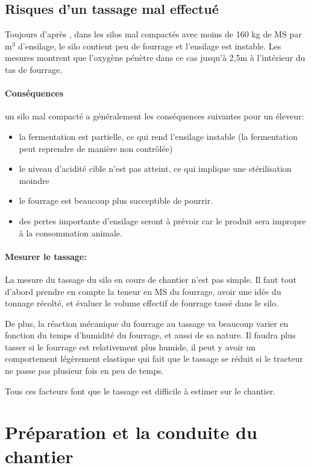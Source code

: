 \documentclass[12pt,a4paper]{report}
\begin{document}
\subsection{Risques d'un tassage mal effectué}
Toujours d'après \cite{trachsler_planifier_nodate}, dans les silos mal compactés avec moins de 160 kg de MS par m$^3$ d'ensilage, le silo contient peu de fourrage et l'ensilage est instable. Les mesures montrent que l'oxygène pénètre dans ce cas jusqu'à 2,5m à l'intérieur du tas de fourrage. 

\paragraph{Conséquences} un silo mal compacté a généralement les conséquences suivantes pour un éleveur:

\begin{itemize}
	\item la fermentation est partielle, ce qui rend l'ensilage instable (la fermentation peut reprendre de manière non contrôlée)
	\item le niveau d'acidité cible n'est pas atteint, ce qui implique une stérilisation moindre
	\item le fourrage est beaucoup plus succeptible de pourrir.
	\item des pertes importante d'ensilage seront à prévoir car le produit sera impropre à la consommation animale.
\end{itemize}

\paragraph{Mesurer le tassage:} La mesure du tassage du silo en cours de chantier n'est pas simple. Il faut tout d'abord prendre en compte la teneur en MS du fourrage, avoir une idée du tonnage récolté, et évaluer le volume effectif de fourrage tassé dans le silo.
\newline

De plus, la réaction mécanique du fourrage au tassage va beaucoup varier en fonction du temps d'humidité du fourrage, et aussi de sa nature. Il faudra plus tasser si le fourrage est relativement plus humide, il peut y avoir un comportement légèrement elastique qui fait que le tassage se réduit si le tracteur ne passe pas plusieur fois en peu de temps. 

Tous ces facteurs font que le tassage est difficile à estimer sur le chantier.

\section{Préparation et la conduite du chantier}
\end{document}
